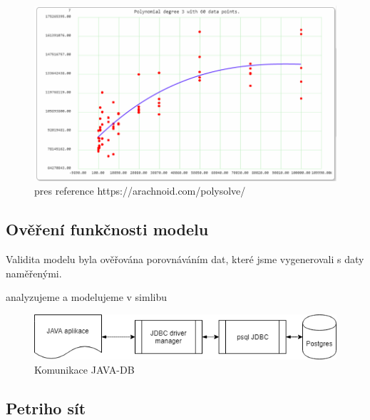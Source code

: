 \documentclass[a4paper, 11pt]{article}
\begin{document}
\begin{figure}[H]
\centering
\includegraphics[width=150mm, frame]{images/VYPOCET-KRIVEK.png}
\caption{pres reference https://arachnoid.com/polysolve/}
\label{sec:obr9}
\end{figure}

\subsection{Ověření funkčnosti modelu}
Validita modelu byla ověřována porovnáváním dat, které jsme vygenerovali s daty naměřenými.

analyzujeme a modelujeme v simlibu\cite{simlib_web, simlib_zdroj}

\begin{figure}[H]
\centering
\includegraphics[width=150mm]{images/JAVA-DB-komunikace.png}
\caption{Komunikace JAVA-DB}
\label{sec:obr8}
\end{figure}



\subsection{Petriho sít}
\end{document}
